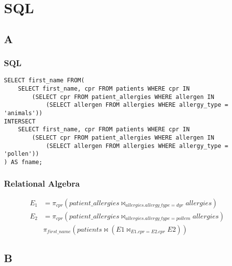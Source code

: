 \documentclass[a4paper,11pt]{article}
\begin{document}
\section{SQL}
\subsection{A}
\subsubsection{SQL}
\begin{verbatim}
SELECT first_name FROM( 
    SELECT first_name, cpr FROM patients WHERE cpr IN 
        (SELECT cpr FROM patient_allergies WHERE allergen IN 
            (SELECT allergen FROM allergies WHERE allergy_type = 'animals'))
INTERSECT
    SELECT first_name, cpr FROM patients WHERE cpr IN 
        (SELECT cpr FROM patient_allergies WHERE allergen IN 
            (SELECT allergen FROM allergies WHERE allergy_type = 'pollen')) 
) AS fname;

\end{verbatim}


\subsubsection{Relational Algebra}
\begin{align*}
   E_1&= \pi_{cpr} (patient\_allergies \bowtie_{allergies.allergy\_type=dyr} allergies)\\
   E_2&=  \pi_{cpr} (patient\_allergies \bowtie_{allergies.allergy\_type=pollem} allergies)\\
      & \pi_{first\_name} (patients \bowtie (E1 \bowtie_{E1.cpr=E2.cpr} E2))
\end{align*}

\subsection{B}
\end{document}
